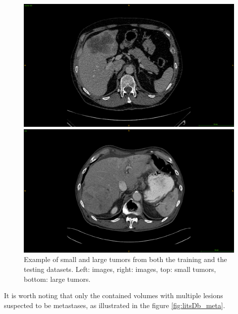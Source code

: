 {\begin{figure}[!ht]
\begin{mdframed}[backgroundcolor=blue!50,linecolor=blue!50]
\begin{minipage}{6cm}
		\end{minipage} \\
		\begin{minipage}{6cm}
			\includegraphics[width=\linewidth]{images/Lits_examplePatientLargeTumor}
		\end{minipage} \hspace{-0.1cm}
		\begin{minipage}{6cm}
			\includegraphics[width=\linewidth]{images/TCIA_examplePatientLargeTumor}
		\end{minipage}
	\end{mdframed}
	\caption{Example of small and large tumors from both the training and the testing datasets. Left: \textbf{} images, right: \textbf{} images, top: small tumors, bottom: large tumors.}
	\label{fig:interdb_tumorExamples}
\end{figure}
It is worth noting that only the \textbf{} contained volumes with multiple lesions suspected to be metastases, as illustrated in the figure \ref{fig:litsDb_meta}.
\begin{figure}[!ht]

\end{figure}}
